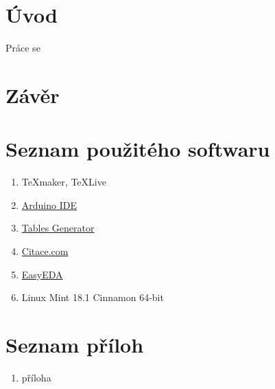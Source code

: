 \documentclass[a4paper,12pt, twoside]{article} %
\begin{document}
\section{Úvod} 
\label{kap:uvod}
Práce se
%
%
\clearpage
\section{Závěr}
%
\clearpage
\renewcommand{\refname}{Seznam použité literatury a zdrojů informací}
\begin{thebibliography}{99}
%
\end{thebibliography}
\clearpage
{} %
\section*{Seznam použitého softwaru}
\begin{enumerate}%
	\item \TeX maker, \TeX Live
	\item \href{https://www.arduino.cc/en/main/software}{Arduino IDE}
	\item \href{https://www.tablesgenerator.com/latex_tables}{Tables Generator}
	\item \href{https://www.citace.com/citace-pro}{Citace.com}
	\item \href{https://easyeda.com/}{EasyEDA}
	\item Linux Mint 18.1 Cinnamon 64-bit
\end{enumerate}
\section*{Seznam příloh} 
\begin{enumerate}[{Příloha} 1:]
\item příloha
\end{enumerate}
\end{document}
